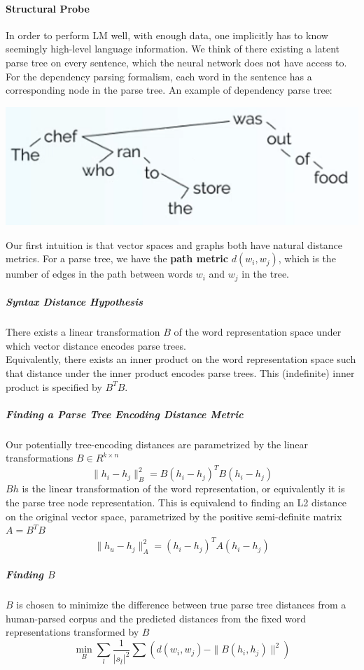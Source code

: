 \documentclass[10pt]{report}
\begin{document}
\paragraph{Structural Probe} In order to perform LM well, with enough data, one implicitly has to know seemingly high-level language information. We think of there existing a latent parse tree on every sentence, which the neural network does not have access to. For the dependency parsing formalism, each word in the sentence has a corresponding node in the parse tree. An example of dependency parse tree:
\begin{center}
	\includegraphics[scale=0.5]{82.png}
\end{center}
Our first intuition is that vector spaces and graphs both have natural distance metrics. For a parse tree, we have the \textbf{path metric} $d(w_i, w_j)$, which is the number of edges in the path between words $w_i$ and $w_j$ in the tree.
\subparagraph{Syntax Distance Hypothesis} There exists a linear transformation $B$ of the word representation space under which vector distance encodes parse trees.\\
Equivalently, there exists an inner product on the word representation space such that distance under the inner product encodes parse trees. This (indefinite) inner product is specified by $B^TB$.
\subparagraph{Finding a Parse Tree Encoding Distance Metric} Our potentially tree-encoding distances are parametrized by the linear transformations $B\in R^{k\times n}$
$$\|h_i-h_j\|^2_B = B(h_i-h_j)^TB(h_i-h_j)$$
$Bh$ is the linear transformation of the word representation, or equivalently it is the parse tree node representation. This is equivalend to finding an L2 distance on the original vector space, parametrized by the positive semi-definite matrix $A=B^TB$
$$\|h_u-h_j\|^2_A = (h_i-h_j)^TA(h_i-h_j)$$
\subparagraph{Finding $B$} $B$ is chosen to minimize the difference between true parse tree distances from a human-parsed corpus and the predicted distances from the fixed word representations transformed by $B$
$$\min_B\sum_l\frac{1}{|s_l|^2}\sum\left(d(w_i,w_j)-\|B(h_i,h_j)\|^2\right)$$
\end{document}
